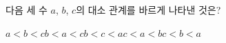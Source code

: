 다음 세 수 $a$, $b$, $c$의 대소 관계를 바르게 나타낸 것은?
\begin{choices32}{$a<b<c$}{$b<a<c$}{$b<c<a$}{$c<a<b$}{$c<b<a$}\end{choices32}
